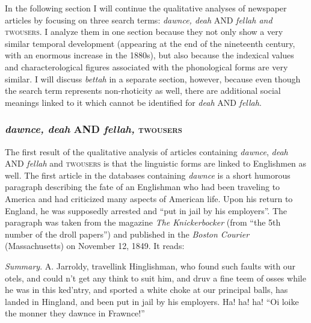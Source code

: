 In the following section I will continue the qualitative analyses of newspaper articles by focusing on three search terms: \emph{dawnce, deah }AND\emph{ fellah \textup{and}}\textsc{ twousers}. I analyze them in one section because they not only show a very similar temporal development (appearing at the end of the nineteenth century, with an enormous increase in the 1880s), but also because the indexical values and characterological figures associated with the phonological forms are very similar. I will discuss \emph{bettah} in a separate section, however, because even though the search term represents non-rhoticity as well, there are additional social meanings linked to it which cannot be identified for \emph{deah} AND \emph{fellah}.

\subsubsection{\emph{dawnce, deah} AND\emph{ fellah,}\textsc{ twousers}}
\hypertarget{Toc63021237}{}
The first result of the qualitative analysis of articles containing \emph{dawnce}, \emph{deah} AND \emph{fellah} and \textsc{twousers} is that the linguistic forms are linked to Englishmen as well. The first article in the databases containing \emph{dawnce} is a short humorous paragraph describing the fate of an Englishman who had been traveling to America and had criticized many aspects of American life. Upon his return to England, he was supposedly arrested and “put in jail by his employers”. The paragraph was taken from the magazine \emph{The Knickerbocker} (from “the 5th number of the droll papers”) and published in the \emph{Boston Courier} (Massachusetts) on November 12, 1849. It reads:

\begin{ipquote}
\textit{Summary}. A. Jarroldy, travellink Hinglishman, who found such faults with our otels, and could n't get any think to suit him, and druv a fine teem of osses while he was in this ked'ntry, and sported a white choke at our principal balls, has landed in Hingland, and been put in jail by his employers. Ha! ha! ha! “Oi loike the monner they dawnce in Frawnce!”
\end{ipquote}


